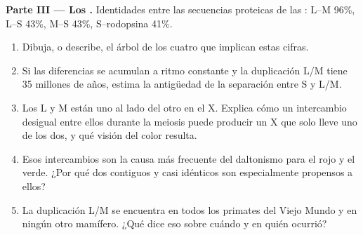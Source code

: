 \begin{problem}
\medskip
\noindent\textbf{Parte III --- Los .}
Identidades entre las secuencias proteicas de las : L--M 96\%,
L--S 43\%, M--S 43\%, S--rodopsina 41\%.
\begin{enumerate}[resume]
  \item Dibuja, o describe, el árbol de los cuatro  que implican
        estas cifras.
  \item Si las diferencias se acumulan a ritmo constante y la
        duplicación L/M tiene 35 millones de años, estima la
        antigüedad de la separación entre S y L/M.
  \item Los  L y M están uno al lado del otro en el X. Explica
        cómo un intercambio desigual entre ellos durante la meiosis
        puede producir un X que solo lleve uno de los dos, y qué
        visión del color resulta.
  \item Esos intercambios son la causa más frecuente del daltonismo
        para el rojo y el verde. ¿Por qué dos  contiguos y casi
        idénticos son especialmente propensos a ellos?
  \item La duplicación L/M se encuentra en todos los primates del Viejo
        Mundo y en ningún otro mamífero. ¿Qué dice eso sobre cuándo y
        en quién ocurrió?
\end{enumerate}


\end{problem}
